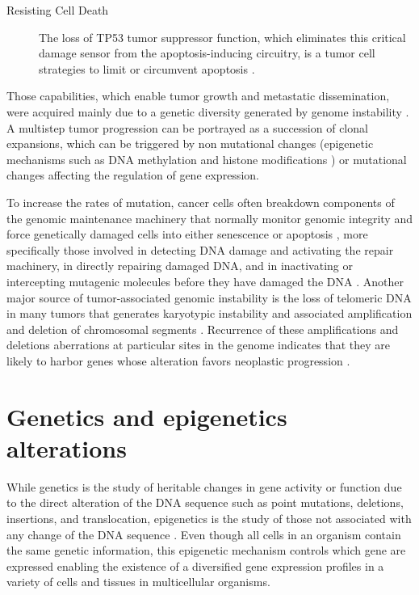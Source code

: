 \begin{description}
    \item[Resisting Cell Death]
    The loss of TP53 tumor suppressor function, which eliminates this critical damage sensor from the apoptosis-inducing circuitry, is a tumor cell strategies to limit or circumvent apoptosis \cite{hanahan2011hallmarks}.
\end{description}

Those capabilities, which enable tumor growth and metastatic dissemination, were acquired mainly due to a genetic diversity
 generated  by genome instability \cite{hanahan2011hallmarks}.
 A multistep tumor progression can be portrayed as
a succession of clonal expansions, which can be triggered by non mutational changes (epigenetic mechanisms such as DNA methylation and histone modifications \cite{berdasco2010aberrant})
or mutational changes affecting the regulation of gene expression.

To increase  the rates of mutation, cancer cells often breakdown components of the genomic maintenance machinery
that normally monitor genomic integrity and force genetically damaged cells into either senescence or apoptosis \cite{jackson2009dna}, more specifically those involved in detecting DNA damage and activating the repair machinery, in directly repairing damaged DNA, and in inactivating or intercepting mutagenic molecules before they have damaged the DNA \cite{negrini2010genomic}. Another major source of tumor-associated genomic instability is the loss of telomeric DNA  in many tumors that generates karyotypic instability and associated amplification and deletion of chromosomal segments \cite{artandi2009telomeres}.  Recurrence  of these amplifications and deletions aberrations at particular sites in the genome
indicates that they are likely to harbor genes whose alteration favors neoplastic progression \cite{korkola2010breast}.


\section{Genetics and epigenetics alterations} \label{sec:concept-alteration}

While genetics is the study of heritable changes in gene activity or function due
to the direct alteration of the DNA sequence such as point mutations, deletions,
insertions, and translocation, epigenetics is the study of  those not associated with any change of the DNA sequence \cite{moore2013dna}.
Even though all cells in an organism contain the same genetic information,
this epigenetic mechanism controls which gene are expressed enabling the existence of
a diversified gene expression profiles
in a variety of cells and tissues in multicellular organisms.



